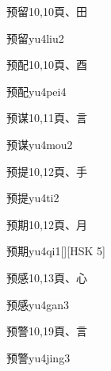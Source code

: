 \begin{Entry}{预留}{10,10}{⾴、⽥}
  \begin{Phonetics}{预留}{yu4liu2}
  \end{Phonetics}
\end{Entry}

\begin{Entry}{预配}{10,10}{⾴、⾣}
  \begin{Phonetics}{预配}{yu4pei4}
  \end{Phonetics}
\end{Entry}

\begin{Entry}{预谋}{10,11}{⾴、⾔}
  \begin{Phonetics}{预谋}{yu4mou2}
  \end{Phonetics}
\end{Entry}

\begin{Entry}{预提}{10,12}{⾴、⼿}
  \begin{Phonetics}{预提}{yu4ti2}
  \end{Phonetics}
\end{Entry}

\begin{Entry}{预期}{10,12}{⾴、⽉}
  \begin{Phonetics}{预期}{yu4qi1}[][HSK 5]
  \end{Phonetics}
\end{Entry}

\begin{Entry}{预感}{10,13}{⾴、⼼}
  \begin{Phonetics}{预感}{yu4gan3}
  \end{Phonetics}
\end{Entry}

\begin{Entry}{预警}{10,19}{⾴、⾔}
  \begin{Phonetics}{预警}{yu4jing3}
  \end{Phonetics}
\end{Entry}

